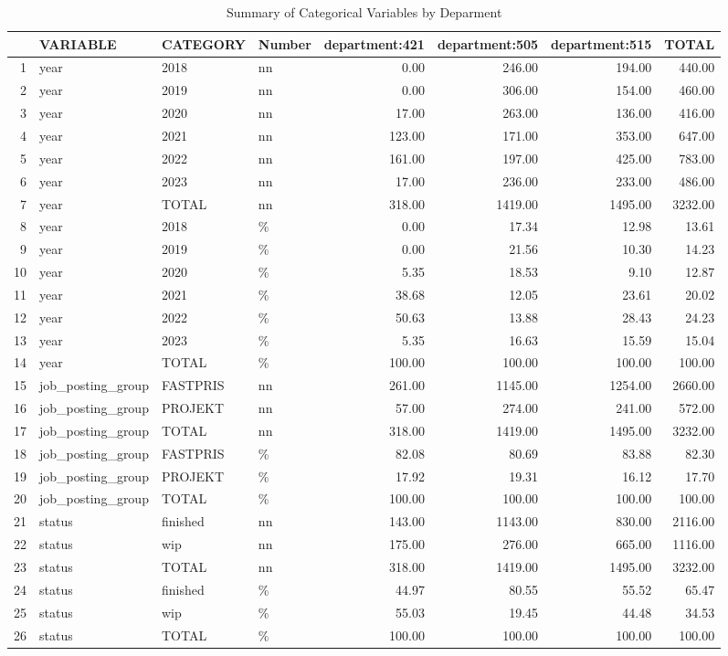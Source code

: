 \begin{sidewaystable}[ht]
\centering
\caption{Summary of Categorical Variables by Deparment} 
\begin{tabular}{rlllrrrr}
  \hline
 & VARIABLE & CATEGORY & Number & department:421 & department:505 & department:515 & TOTAL \\ 
  \hline
1 & year & 2018 & nn & 0.00 & 246.00 & 194.00 & 440.00 \\ 
  2 & year & 2019 & nn & 0.00 & 306.00 & 154.00 & 460.00 \\ 
  3 & year & 2020 & nn & 17.00 & 263.00 & 136.00 & 416.00 \\ 
  4 & year & 2021 & nn & 123.00 & 171.00 & 353.00 & 647.00 \\ 
  5 & year & 2022 & nn & 161.00 & 197.00 & 425.00 & 783.00 \\ 
  6 & year & 2023 & nn & 17.00 & 236.00 & 233.00 & 486.00 \\ 
  7 & year & TOTAL & nn & 318.00 & 1419.00 & 1495.00 & 3232.00 \\ 
  8 & year & 2018 & \% & 0.00 & 17.34 & 12.98 & 13.61 \\ 
  9 & year & 2019 & \% & 0.00 & 21.56 & 10.30 & 14.23 \\ 
  10 & year & 2020 & \% & 5.35 & 18.53 & 9.10 & 12.87 \\ 
  11 & year & 2021 & \% & 38.68 & 12.05 & 23.61 & 20.02 \\ 
  12 & year & 2022 & \% & 50.63 & 13.88 & 28.43 & 24.23 \\ 
  13 & year & 2023 & \% & 5.35 & 16.63 & 15.59 & 15.04 \\ 
  14 & year & TOTAL & \% & 100.00 & 100.00 & 100.00 & 100.00 \\ 
  15 & job\_posting\_group & FASTPRIS & nn & 261.00 & 1145.00 & 1254.00 & 2660.00 \\ 
  16 & job\_posting\_group & PROJEKT & nn & 57.00 & 274.00 & 241.00 & 572.00 \\ 
  17 & job\_posting\_group & TOTAL & nn & 318.00 & 1419.00 & 1495.00 & 3232.00 \\ 
  18 & job\_posting\_group & FASTPRIS & \% & 82.08 & 80.69 & 83.88 & 82.30 \\ 
  19 & job\_posting\_group & PROJEKT & \% & 17.92 & 19.31 & 16.12 & 17.70 \\ 
  20 & job\_posting\_group & TOTAL & \% & 100.00 & 100.00 & 100.00 & 100.00 \\ 
  21 & status & finished & nn & 143.00 & 1143.00 & 830.00 & 2116.00 \\ 
  22 & status & wip & nn & 175.00 & 276.00 & 665.00 & 1116.00 \\ 
  23 & status & TOTAL & nn & 318.00 & 1419.00 & 1495.00 & 3232.00 \\ 
  24 & status & finished & \% & 44.97 & 80.55 & 55.52 & 65.47 \\ 
  25 & status & wip & \% & 55.03 & 19.45 & 44.48 & 34.53 \\ 
  26 & status & TOTAL & \% & 100.00 & 100.00 & 100.00 & 100.00 \\ 
   \hline
\end{tabular}
\end{sidewaystable}
